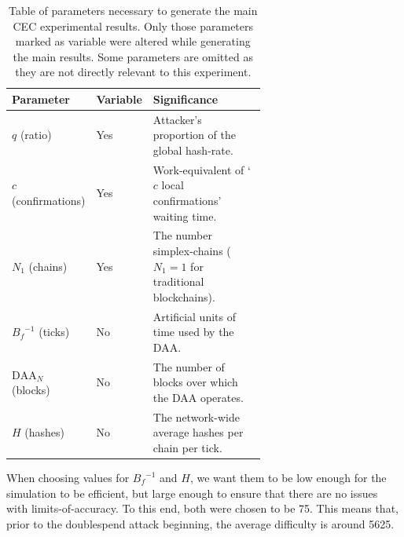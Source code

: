 \begin{table}[H]
    \centering
    \caption[
        Table of parameters necessary to generate the main CEC experimental results.
    ]{
        Table of parameters necessary to generate the main CEC experimental results.
        Only those parameters marked as variable were altered while generating the main results.
        Some parameters are omitted as they are not directly relevant to this experiment.
    }
    \begin{tabular}{llp{0.64\linewidth}}
        \toprule
        Parameter & Variable & Significance \\
        \midrule
        $q$ (ratio) & Yes & Attacker's proportion of the global hash-rate. \\
        $c$ (confirmations) & Yes & Work-equivalent of `$c$ local confirmations' waiting time. \\
        $N_1$ (chains) & Yes & The number simplex-chains ($N_1 = 1$ for traditional blockchains). \\
        ${B_f}^{-1}$ (ticks) & No & Artificial units of time used by the DAA. \\
        $\text{DAA}_N$ (blocks) & No & The number of blocks over which the DAA operates. \\
        $H$ (hashes) & No & The network-wide average hashes per chain per tick. \\
        \bottomrule
    \end{tabular}
\end{table}



When choosing values for ${B_f}^{-1}$ and $H$, we want them to be low enough for the simulation to be efficient, but large enough to ensure that there are no issues with limits-of-accuracy.
To this end, both were chosen to be 75.
This means that, prior to the doublespend attack beginning, the average difficulty is around 5625.

